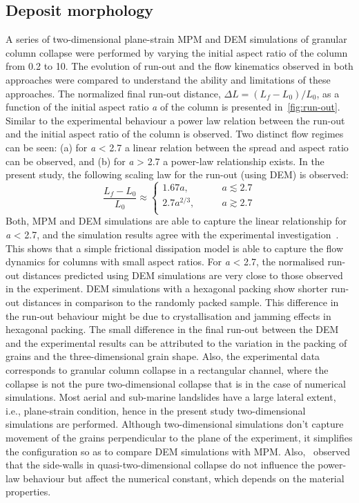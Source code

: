 \subsection{Deposit morphology}
A series of two-dimensional plane-strain MPM and DEM simulations of granular 
column collapse were performed by varying the initial aspect ratio of the 
column from 0.2 to 10. The evolution of run-out and the flow kinematics 
observed in both approaches were compared to understand the ability and 
limitations of these approaches. The normalized final run-out distance, $\Delta 
L = (L_{{f}}-L_{0})/L_{0}$, as a function of the initial aspect ratio 
\textit{a} of the column is presented in~\cref{fig:run-out}. Similar to the 
experimental behaviour a power law relation between the run-out 
and the initial aspect ratio of the column is observed. Two distinct flow 
regimes can be seen: (a) for \textit{a} < 2.7 a linear relation between the 
spread and aspect ratio can be observed, and (b) for \textit{a} > 2.7 a 
power-law relationship exists. In the present study, the following scaling law 
for the run-out (using DEM) is observed:
%
\begin{equation}
\frac{L_{{f}}-L_{0}}{L_{0}} \approx  
\begin{cases}
1.67 a, &\qquad \textit{a}\lesssim 2.7 \\
2.7 a^{2/3}, &\qquad \textit{a} \gtrsim 2.7 \\
\end{cases}
\end{equation}
Both, MPM and DEM simulations are able to capture the linear relationship for 
\textit{a} < 2.7, and the simulation results agree with the experimental 
investigation~\citep{Lajeunesse2005}. This shows that a simple frictional 
dissipation model is able to capture the flow dynamics for columns with small 
aspect ratios. For \textit{a} < 2.7, the normalised run-out distances predicted 
using DEM simulations are very close to those observed in the experiment. DEM 
simulations with a hexagonal packing show shorter run-out distances in 
comparison to the randomly packed sample. This difference in the run-out 
behaviour might be due to crystallisation and jamming effects in hexagonal 
packing. The small difference in the final run-out between the DEM and the 
experimental results can be attributed to the variation in the packing of 
grains and the three-dimensional grain shape. Also, the experimental data 
corresponds to granular column collapse in a rectangular channel, where the 
collapse is not the pure two-dimensional collapse that is in the case of 
numerical simulations. Most aerial and sub-marine landslides have a large 
lateral extent, i.e., plane-strain condition, hence in the present study 
two-dimensional simulations are performed. Although two-dimensional simulations 
don't capture movement of the grains perpendicular to the plane of the 
experiment, it simplifies the configuration so as to compare DEM simulations 
with MPM. Also,~\citet{Balmforth2005} observed that the side-walls 
in quasi-two-dimensional collapse do not influence the power-law behaviour 
but affect the numerical constant, which depends on the material properties. 

